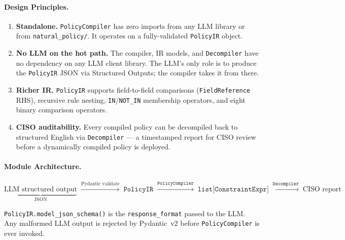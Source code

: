 \documentclass[12pt,a4paper,oneside]{report}
\newcommand{\fname}[1]{\texttt{#1}}          %
\newcommand{\code}[1]{\texttt{#1}}           %
\begin{document}
\paragraph{Design Principles.}

\begin{enumerate}
\item \textbf{Standalone.}  \code{PolicyCompiler} has zero imports from any
  LLM library or from \fname{natural\_policy/}.  It operates on a
  fully-validated \code{PolicyIR} object.
\item \textbf{No LLM on the hot path.}  The compiler, IR models, and
  \code{Decompiler} have no dependency on any LLM client library.  The LLM's
  only role is to produce the \code{PolicyIR} JSON via Structured Outputs;
  the compiler takes it from there.
\item \textbf{Richer IR.}  \code{PolicyIR} supports field-to-field
  comparisons (\code{FieldReference} RHS), recursive rule nesting,
  \code{IN}/\code{NOT\_IN} membership operators, and eight binary comparison
  operators.
\item \textbf{CISO auditability.}  Every compiled policy can be decompiled
  back to structured English via \code{Decompiler} --- a timestamped report
  for CISO review before a dynamically compiled policy is deployed.
\end{enumerate}

\paragraph{Module Architecture.}

\[
  \underbrace{\text{LLM structured output}}_{\text{JSON}}
  \;\xrightarrow{\text{Pydantic validate}}\;
  \code{PolicyIR}
  \;\xrightarrow{\code{PolicyCompiler}}\;
  \code{list[ConstraintExpr]}
  \;\xrightarrow{\code{Decompiler}}\;
  \text{CISO report}
\]

\code{PolicyIR.model\_json\_schema()} is the \code{response\_format} passed
to the LLM.  Any malformed LLM output is rejected by Pydantic~v2 before
\code{PolicyCompiler} is ever invoked.
\end{document}
